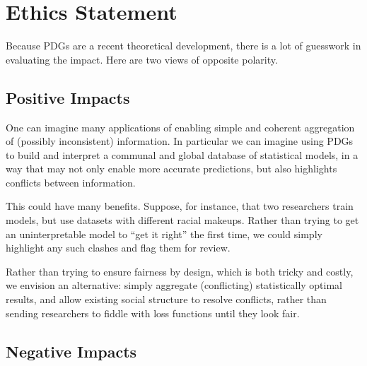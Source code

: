 \documentclass[letterpaper]{article} %
\theoremstyle{plain}
\theoremstyle{definition}
\theoremstyle{remark}
\begin{document}
\clearpage
{
            
}

\section*{Ethics Statement}
Because PDGs are a recent theoretical development, there is a lot of
guesswork in evaluating the impact. Here are two views of opposite polarity.

\subsection{Positive Impacts}
One can imagine many applications of enabling simple and coherent
aggregation of (possibly inconsistent) information. In particular we
can imagine using PDGs to build and interpret a communal and global
database of statistical models, in a way that may not only enable more
accurate predictions, but also highlights conflicts between
information.

This could have many benefits. Suppose, for instance, that two researchers train
models, but use datasets with different racial makeups. Rather than trying to
get an uninterpretable model to ``get it right'' the first time, we could simply
highlight any
such clashes and flag them for review.

Rather than trying to ensure fairness by design, which is both tricky and
costly, we envision an alternative: simply aggregate (conflicting) statistically
optimal results, and allow existing social structure to resolve conflicts,
rather than sending researchers to fiddle with loss functions until they look fair. 


\subsection{Negative Impacts}
\end{document}
